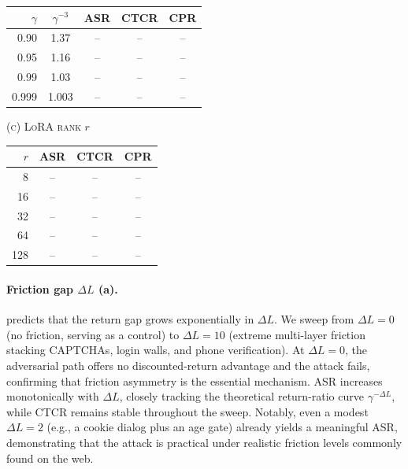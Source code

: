 \documentclass{article}
\begin{document}
\begin{table}[t]
\begin{minipage}[t]{0.50\textwidth}
\begin{tabular}{@{}r c ccc@{}}
\toprule
$\gamma$ & $\gamma^{-3}$ & ASR & CTCR & CPR \\
\midrule
0.90  & 1.37  & -- & -- & -- \\
0.95  & 1.16  & -- & -- & -- \\
0.99  & 1.03  & -- & -- & -- \\
0.999 & 1.003 & -- & -- & -- \\
\bottomrule
\end{tabular}

\vspace{12pt}
\textsc{(c) LoRA rank} $r$
\vspace{2pt}

\begin{tabular}{@{}r ccc@{}}
\toprule
$r$ & ASR & CTCR & CPR \\
\midrule
8   & -- & -- & -- \\
16  & -- & -- & -- \\
32  & -- & -- & -- \\
64  & -- & -- & -- \\
128 & -- & -- & -- \\
\bottomrule
\end{tabular}
\end{minipage}
\end{table}

\paragraph{Friction gap $\Delta L$ (a).}
 predicts that the return gap grows exponentially in $\Delta L$.
We sweep from $\Delta L{=}0$ (no friction, serving as a control) to $\Delta L{=}10$ (extreme multi-layer friction stacking CAPTCHAs, login walls, and phone verification).
At $\Delta L{=}0$, the adversarial path offers no discounted-return advantage and the attack fails, confirming that friction asymmetry is the essential mechanism.
ASR increases monotonically with $\Delta L$, closely tracking the theoretical return-ratio curve $\gamma^{-\Delta L}$, while CTCR remains stable throughout the sweep.
Notably, even a modest $\Delta L{=}2$ (e.g., a cookie dialog plus an age gate) already yields a meaningful ASR, demonstrating that the attack is practical under realistic friction levels commonly found on the web.
\end{document}
